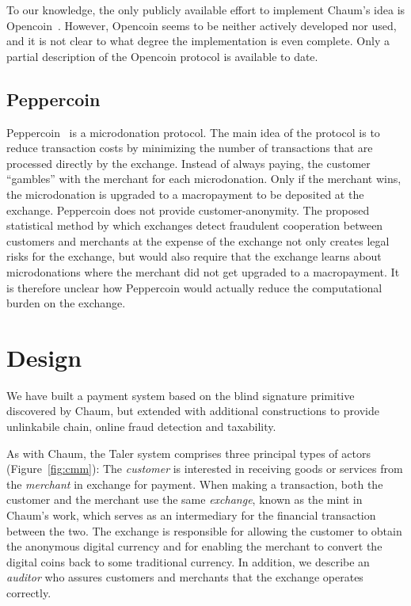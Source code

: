 \documentclass{llncs}
\begin{document}
To our knowledge, the only publicly available effort to implement
Chaum's idea is Opencoin~\cite{dent2008extensions}.  However, Opencoin
seems to be neither actively developed nor used, and it is not clear
to what degree the implementation is even complete.  Only a partial
description of the Opencoin protocol is available to date.


\subsection{Peppercoin}

Peppercoin~\cite{rivest2004peppercoin} is a microdonation protocol.
The main idea of the protocol is to reduce transaction costs by
minimizing the number of transactions that are processed directly by
the exchange.  Instead of always paying, the customer ``gambles'' with the
merchant for each microdonation.  Only if the merchant wins, the
microdonation is upgraded to a macropayment to be deposited at the
exchange.  Peppercoin does not provide customer-anonymity.  The proposed
statistical method by which exchanges detect fraudulent cooperation between
customers and merchants at the expense of the exchange not only creates
legal risks for the exchange, but would also require that the exchange learns
about microdonations where the merchant did not get upgraded to a
macropayment.  It is therefore unclear how Peppercoin would actually
reduce the computational burden on the exchange.


\section{Design}

We have built a payment system based on the blind signature primitive
discovered by Chaum, but extended with additional constructions to
provide unlinkabile chain, online fraud detection and taxability.

As with Chaum, the Taler system comprises three principal types of
actors (Figure~\ref{fig:cmm}): The \emph{customer} is interested in
receiving goods or services from the \emph{merchant} in exchange for
payment.  When making a transaction, both the customer and the
merchant use the same \emph{exchange}, known as the mint in Chaum's
work, which serves as an intermediary for the financial transaction
between the two.  The exchange is responsible for allowing the customer
to obtain the anonymous digital currency and for enabling the merchant
to convert the digital coins back to some traditional currency.
In addition, we describe an \emph{auditor} who assures customers and
merchants that the exchange operates correctly.
\end{document}
